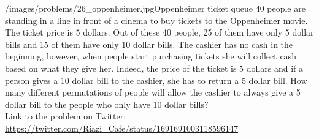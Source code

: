 \begin{problem}{/images/problems/26_oppenheimer.jpg}{Oppenheimer ticket queue}
40 people are standing in a line in front of a cinema to buy tickets to the Oppenheimer movie. The ticket price is 5 dollars. Out of these 40 people, 25 of them have only 5 dollar bills and 15 of them have only 10 dollar bills. The cashier has no cash in the beginning, however, when people start purchasing tickets she will collect cash based on what they give her. Indeed, the price of the ticket is 5 dollars and if a person gives a 10 dollar bill to the cashier, she has to return a 5 dollar bill. How many different permutations of people will allow the cashier to always give a 5 dollar bill to the people who only have 10 dollar bills?\\[0.2cm]

Link to the problem on Twitter:  \url{https://twitter.com/Riazi_Cafe/status/1691691003118596147}\end{problem}
